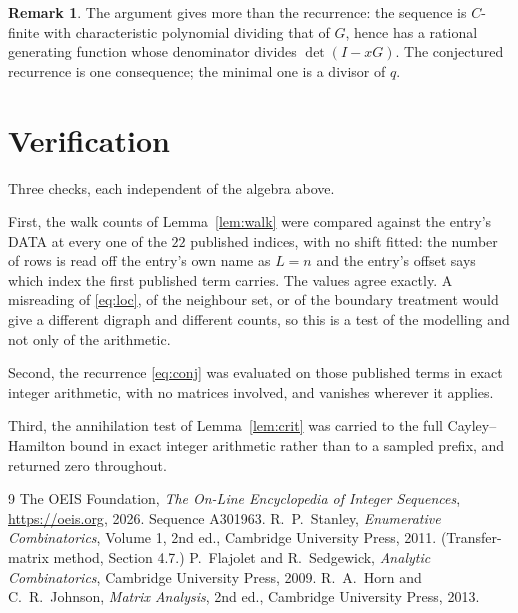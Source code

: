 \documentclass[11pt,a4paper]{article}
\theoremstyle{plain}
\theoremstyle{definition}
\newtheorem{remark}[theorem]{Remark}
\begin{document}
\begin{remark}
The argument gives more than the recurrence: the sequence is $C$-finite with characteristic
polynomial dividing that of $G$, hence has a rational generating function whose denominator
divides $\det(I-xG)$. The conjectured recurrence is one consequence; the minimal one is a
divisor of $q$.
\end{remark}

\section{Verification}

Three checks, each independent of the algebra above.

First, the walk counts of Lemma~\ref{lem:walk} were compared against the entry's DATA at
every one of the $22$ published indices, with no shift fitted: the number of rows is
read off the entry's own name as $L=n$ and the entry's offset says which index the first
published term carries. The values agree exactly. A misreading of \eqref{eq:loc}, of the
neighbour set, or of the boundary treatment would give a different digraph and different
counts, so this is a test of the modelling and not only of the arithmetic.

Second, the recurrence \eqref{eq:conj} was evaluated on those published terms in exact
integer arithmetic, with no matrices involved, and vanishes wherever it applies.

Third, the annihilation test of Lemma~\ref{lem:crit} was carried to the full
Cayley--Hamilton bound in exact integer arithmetic rather than to a sampled prefix, and
returned zero throughout.

\begin{thebibliography}{9}
 The OEIS Foundation, \emph{The On-Line Encyclopedia of Integer
Sequences}, \url{https://oeis.org}, 2026. Sequence A301963.
 R.~P.~Stanley, \emph{Enumerative Combinatorics}, Volume 1, 2nd ed.,
Cambridge University Press, 2011. (Transfer-matrix method, Section 4.7.)
 P.~Flajolet and R.~Sedgewick, \emph{Analytic Combinatorics}, Cambridge
University Press, 2009.
 R.~A.~Horn and C.~R.~Johnson, \emph{Matrix Analysis}, 2nd ed., Cambridge
University Press, 2013.
\end{thebibliography}
\end{document}
